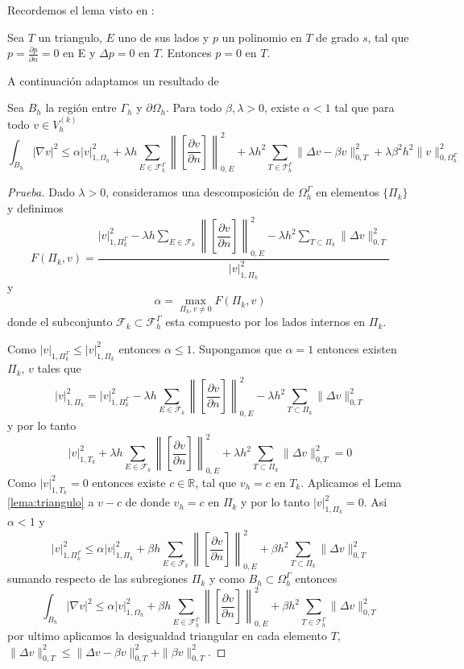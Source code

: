 Recordemos el lema visto en \cite[Lema 3.2 en p.~1013]{duprez2020phi}:
\begin{lema}\label{lema:triangulo}
	Sea $T$ un triangulo, $E$ uno de sus lados y $p$ un polinomio en $T$ de grado $s$, tal que $p=\frac{\partial p}{\partial n}=0$ en E y $\Delta p=0$ en $T$. Entonces $p=0$ en $T$.
\end{lema}
A continuación adaptamos un resultado de
\cite[Lema 3.5 en p.~82]{lozinski2019cutfem}
\begin{lema}\label{lema:alfa}
	Sea $B_h$ la región entre $\Gamma_h$ y $\partial\Omega_h$. Para todo $\beta,\lambda>0$, existe $\alpha<1$ tal que para todo $v\in V_h^{(k)}$
	\[
	\int_{B_h} |\nabla v|^2 \leq \alpha |v|^2_{1,\Omega_h}+ \lambda h \sum_{E\in \mathcal{F}_h^\Gamma}\left\| \left[ \frac{\partial v}{\partial n}\right] \right\|^2_{0,E}+\lambda h^2 \sum_{T\in \mathcal{T}_h^\Gamma} \|\Delta v-\beta v\|^2_{0,T}+ \lambda \beta^2 h^2\|v\|^2_{0,\Omega^\Gamma_h}
	\]
\end{lema}	
\begin{proof}[Prueba]
	Dado $\lambda>0$, consideramos una descomposición de $\Omega_h^\Gamma$ en elementos $\{\Pi_k\}$ y definimos
	\[
	F(\Pi_k,v)=\dfrac{|v|^2_{1,\Pi_k^\Gamma} -  \lambda h \displaystyle\sum_{E\in \mathcal{F}_k}\left\| \left[ \dfrac{\partial v}{\partial n}\right] \right\|^2_{0,E}-\lambda h^2 \displaystyle\sum_{T\subset \Pi_k} \|\Delta v\|^2_{0,T}}{ |v|^2_{1,\Pi_k}}
	\]
	y \[
	\alpha = \max_{\Pi_k,v\neq 0} F(\Pi_k,v)
	\]
	donde el subconjunto $\mathcal{F}_k \subset \mathcal{F}_h^\Gamma$ esta compuesto por los lados internos en $\Pi_k$.
	
	Como  $|v|_{1,\Pi_k^\Gamma}\leq  |v|^2_{1,\Pi_k}$ entonces $\alpha \leq 1$. Supongamos que $\alpha=1$ entonces existen $\Pi_k$, $v$ tales que
	\[
	|v|^2_{1,\Pi_k}=	|v|^2_{1,\Pi_k^\Gamma} -  \lambda h \sum_{E\in \mathcal{F}_k}\left\| \left[ \frac{\partial v}{\partial n}\right] \right\|^2_{0,E}-\lambda h^2 \sum_{T \subset\Pi_k } \|\Delta v\|^2_{0,T} 
	\]
	y por lo tanto
	\[
	|v|^2_{1,T_k}+  \lambda h \sum_{E\in \mathcal{F}_k}\left\| \left[ \frac{\partial v}{\partial n}\right] \right\|^2_{0,E}+\lambda h^2 \sum_{T  \subset\Pi_k} \|\Delta v\|^2_{0,T} =0
	\]
	Como $|v|^2_{1,T_k}=0$ entonces existe $c\in\mathbb{R}$, tal que $v_h=c$ en $T_k$. Aplicamos el Lema \ref{lema:triangulo} a $v-c$ de donde $v_h=c$ en $\Pi_k$ y por lo tanto 	$|v|^2_{1,\Pi_k}=0$. Asi $\alpha<1$	y
	\[
	|v|^2_{1,\Pi_k^\Gamma}\leq \alpha	|v|^2_{1,\Pi_k} +  \beta h \sum_{E\in \mathcal{F}_k}\left\| \left[ \frac{\partial v}{\partial n}\right] \right\|^2_{0,E} + \beta h^2 \sum_{T \subset\Pi_k } \|\Delta v\|^2_{0,T} 
	\]
	sumando respecto de las subregiones $\Pi_k$ y como $B_h\subset \Omega_h^\Gamma$ entonces
	\[
	\int_{B_h} |\nabla v|^2 \leq \alpha |v|^2_{1,\Omega_h}+ \beta h \sum_{E\in \mathcal{F}_h^\Gamma}\left\| \left[ \frac{\partial v}{\partial n}\right] \right\|^2_{0,E}+\beta h^2 \sum_{T\in \mathcal{T}_h^\Gamma} \|\Delta v\|^2_{0,T}
	\]
	por ultimo aplicamos la desigualdad triangular en cada elemento $T$, $\|\Delta v\|^2_{0,T}\leq \|\Delta v-\beta v\|^2_{0,T}+\|\beta v\|^2_{0,T}$.
\end{proof}	
